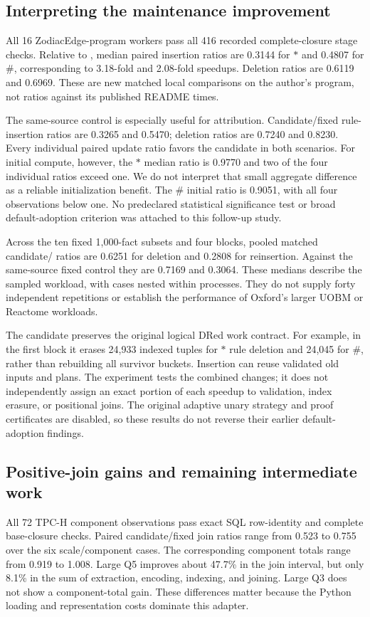 \subsection{Interpreting the maintenance improvement}
All 16 ZodiacEdge-program workers pass all 416 recorded complete-closure stage
checks. Relative to , median paired insertion ratios are 0.3144
for $*$ and 0.4807 for $\#$, corresponding to 3.18-fold and 2.08-fold speedups.
Deletion ratios are 0.6119 and 0.6969. These are new matched local comparisons
on the author's program, not ratios against its published README times.

The same-source control is especially useful for attribution. Candidate/fixed
rule-insertion ratios are 0.3265 and 0.5470; deletion ratios are 0.7240 and
0.8230. Every individual paired update ratio favors the candidate in both
scenarios. For initial compute, however, the $*$ median ratio is 0.9770 and
two of the four individual ratios exceed one. We do not interpret that small
aggregate difference as a reliable initialization benefit. The $\#$ initial
ratio is 0.9051, with all four observations below one. No predeclared statistical
significance test or broad default-adoption criterion was attached to this
follow-up study.

Across the ten fixed 1,000-fact subsets and four blocks, pooled matched
candidate/ ratios are 0.6251 for deletion and 0.2808 for
reinsertion. Against the same-source fixed control they are 0.7169 and 0.3064.
These medians describe the sampled workload, with cases nested within processes.
They do not supply forty independent repetitions or establish the performance
of Oxford's larger UOBM or Reactome workloads.

The candidate preserves the original logical DRed work contract. For example,
in the first block it erases 24,933 indexed tuples for $*$ rule deletion and
24,045 for $\#$, rather than rebuilding all survivor buckets. Insertion can
reuse validated old inputs and plans. The experiment tests the combined changes;
it does not independently assign an exact portion of each speedup to validation,
index erasure, or positional joins. The original adaptive unary strategy and
proof certificates are disabled, so these results do not reverse their earlier
default-adoption findings.

\subsection{Positive-join gains and remaining intermediate work}
All 72 TPC-H component observations pass exact SQL row-identity and complete
base-closure checks. Paired candidate/fixed join ratios range from 0.523 to
0.755 over the six scale/component cases. The corresponding component totals
range from 0.919 to 1.008. Large Q5 improves about 47.7\% in the join interval,
but only 8.1\% in the sum of extraction, encoding, indexing, and joining.
Large Q3 does not show a component-total gain. These differences matter because
the Python loading and representation costs dominate this adapter.

